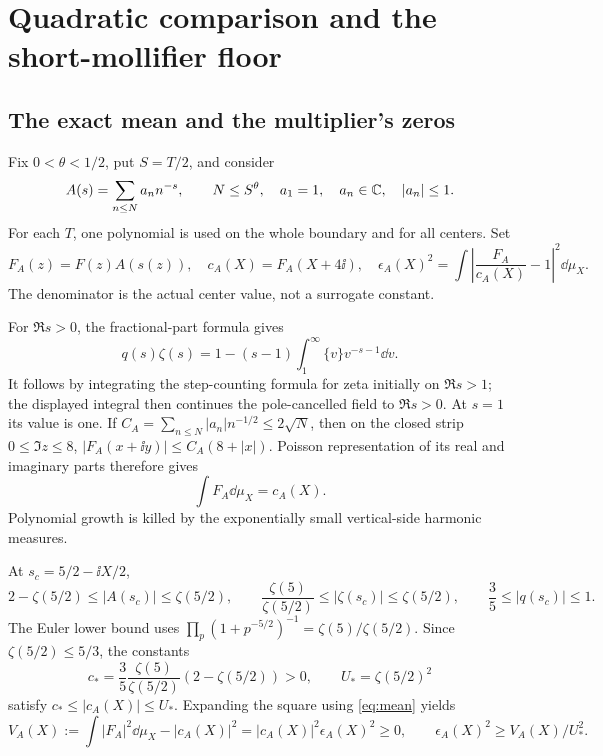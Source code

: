 \section{Quadratic comparison and the short-mollifier floor}\label{sec:quadratic}

\subsection{The exact mean and the multiplier's zeros}

Fix \(0<\theta<1/2\), put \(S=T/2\), and consider
\begin{equation}\label{eq:A-class}
 A(s)=\sum_{n\le N}a_nn^{-s},\qquad
 N\le S^\theta,\quad a_1=1,\quad a_n\in\mathbb C,\quad |a_n|\le1.
\end{equation}
For each \(T\), one polynomial is used on the whole boundary and for
all centers. Set
\[
 F_A(z)=F(z)A(s(z)),\quad c_A(X)=F_A(X+4\ii),\quad
 \epsilon_A(X)^2=\int\left|\frac{F_A}{c_A(X)}-1\right|^2\dd\mu_X .
\]
The denominator is the actual center value, not a surrogate constant.

For \(\Re s>0\), the fractional-part formula gives
\begin{equation}\label{eq:fractional}
 q(s)\zeta(s)=1-(s-1)\int_1^\infty\{v\}v^{-s-1}\dd v.
\end{equation}
It follows by integrating the step-counting formula for zeta initially
on \(\Re s>1\); the displayed integral then continues the pole-cancelled
field to \(\Re s>0\). At \(s=1\) its value is one. If
\(C_A=\sum_{n\le N}|a_n|n^{-1/2}\le2\sqrt N\), then on the closed
strip \(0\le\Im z\le8\),
\(|F_A(x+\ii y)|\le C_A(8+|x|)\).
Poisson representation of its real and imaginary parts therefore gives
\begin{equation}\label{eq:mean}
 \int F_A\dd\mu_X=c_A(X).
\end{equation}
Polynomial growth is killed by the exponentially small vertical-side
harmonic measures.

At \(s_c=5/2-\ii X/2\),
\[
 2-\zeta(5/2)\le|A(s_c)|\le\zeta(5/2),\qquad
 \frac{\zeta(5)}{\zeta(5/2)}\le|\zeta(s_c)|\le\zeta(5/2),\qquad
 \frac35\le|q(s_c)|\le1.
\]
The Euler lower bound uses
\(\prod_p(1+p^{-5/2})^{-1}=\zeta(5)/\zeta(5/2)\).
Since \(\zeta(5/2)\le5/3\), the constants
\begin{equation}\label{eq:center-bounds}
 c_*=\frac35\frac{\zeta(5)}{\zeta(5/2)}(2-\zeta(5/2))>0,\qquad
 U_*=\zeta(5/2)^2
\end{equation}
satisfy \(c_*\le|c_A(X)|\le U_*\).
Expanding the square using \eqref{eq:mean} yields
\begin{equation}\label{eq:variance}
 V_A(X):=\int|F_A|^2\dd\mu_X-|c_A(X)|^2
 =|c_A(X)|^2\epsilon_A(X)^2\ge0,\qquad
 \epsilon_A(X)^2\ge V_A(X)/U_*^2.
\end{equation}

